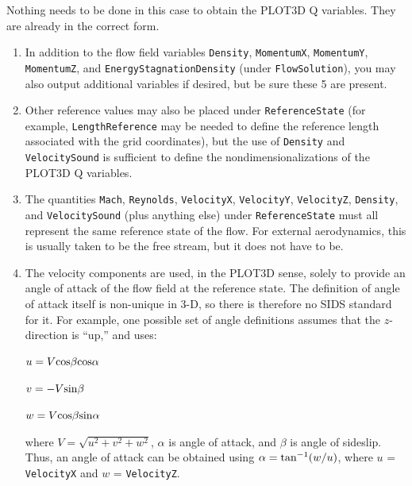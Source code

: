 \documentclass[12pt]{article}
\begin{document}
Nothing needs to be done in this case
to obtain the PLOT3D Q variables.  They are already in
the correct form.

 \label{sec:notesD}

\begin{enumerate}
\item In addition to the flow field variables
{\tt Density}, {\tt MomentumX}, {\tt MomentumY},
{\tt MomentumZ}, and {\tt EnergyStagnationDensity} (under {\tt FlowSolution}), you may
also output additional variables if desired, 
but be sure these 5 are present. \label{Itemnote1}

\item Other reference values may also be placed under
{\tt ReferenceState} (for example, {\tt LengthReference} may be needed to define
the reference length associated with the grid coordinates), 
but the use of {\tt Density} and {\tt VelocitySound}
is sufficient to define the nondimensionalizations of the PLOT3D Q
variables.  \label{Itemnote2}

\item The quantities {\tt Mach}, {\tt Reynolds},
{\tt VelocityX}, {\tt VelocityY}, {\tt VelocityZ},
{\tt Density}, and {\tt VelocitySound} (plus anything else)
under {\tt ReferenceState}
must all represent the same reference state of the
flow.  For external aerodynamics, this is usually taken to be
the free stream, but it does not have to be. \label{Itemnote3}

\item The velocity components are used, in the PLOT3D sense, solely to
provide an angle of attack of the flow field at the reference
state.  The definition of angle of attack itself is non-unique in 3-D, so there
is therefore no SIDS standard for it.  For example, one
possible set of angle definitions assumes that the $z$-direction is ``up,''
and uses:

$u = V{\rm cos}\beta {\rm cos}\alpha$

$v = -V{\rm sin} \beta$

$w = V{\rm cos}\beta{\rm sin}\alpha$ 

\noindent where $V=\sqrt{u^2+v^2+w^2}$, $\alpha$ is angle of attack,
and $\beta$ is angle of sideslip.  Thus, an angle of attack 
can be obtained using $\alpha = {\rm tan}^{-1}(w/u)$, where $u$ = {\tt VelocityX}
and $w$ = {\tt VelocityZ}.  \label{Itemnote4}


\end{enumerate}
\end{document}
